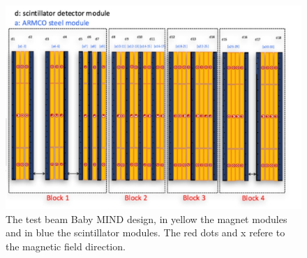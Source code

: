 \begin{figure}[h!]
\centering
\includegraphics[width=\textwidth]{figures/MIND.jpeg}
\caption{The test beam Baby MIND design, in yellow the magnet modules and in blue the scintillator modules. The red dots and x refere to the magnetic field direction.}
\label{fig:design}
\end{figure}


